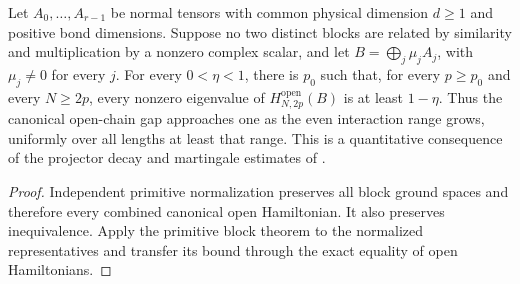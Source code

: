 \begin{lemma}
    \label{thm:normal_block_open_prescribed_gap}
    \leanok
    Let $A_0,\ldots,A_{r-1}$ be normal tensors with common physical
    dimension $d\geq1$ and positive bond dimensions. Suppose no two
    distinct blocks are related by similarity and multiplication by a
    nonzero complex scalar, and let $B=\bigoplus_j\mu_jA_j$, with
    $\mu_j\ne0$ for every $j$. For every $0<\eta<1$, there is $p_0$
    such that, for every $p\geq p_0$ and every $N\geq2p$, every nonzero
    eigenvalue of $H^{\mathrm{open}}_{N,2p}(B)$ is at least $1-\eta$.
    Thus the canonical open-chain gap approaches one as the even
    interaction range grows, uniformly over all lengths at least that
    range. This is a quantitative consequence of the projector decay and
    martingale estimates of
    \cite[Theorem~2.1(ii) and Section~6]{Nachtergaele1996Spectral}.
\end{lemma}
\begin{proof}\leanok
    Independent primitive normalization preserves all block ground spaces
    and therefore every combined canonical open Hamiltonian. It also
    preserves inequivalence. Apply the primitive block theorem to the
    normalized representatives and transfer its bound through the exact
    equality of open Hamiltonians.
\end{proof}
